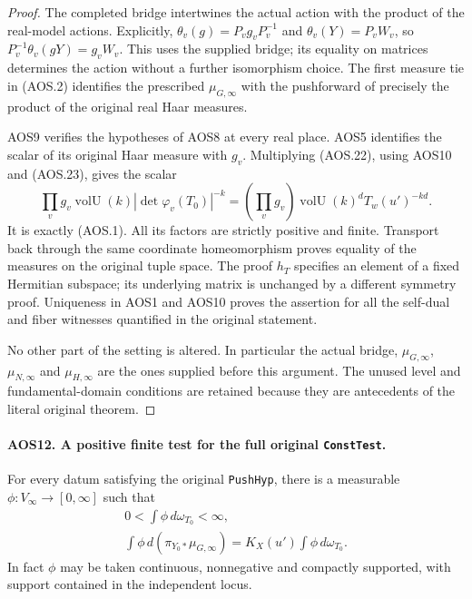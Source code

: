 \documentclass[11pt,a4paper]{article}
\numberwithin{equation}{section}
\theoremstyle{remark}\newtheorem{remark}[theorem]{Remark}
\begin{document}
\begin{proof}
The completed bridge intertwines the actual action with the product
of the real-model actions.  Explicitly,
$\theta_v(g)=P_vg_vP_v^{-1}$ and
$\theta_v(Y)=P_vW_v$, so
$P_v^{-1}\theta_v(gY)=g_vW_v$.  This uses the supplied bridge;
its equality on matrices determines the action without a further
isomorphism choice.  The first measure tie in (AOS.2) identifies
the prescribed $\mu_{G,\infty}$ with the pushforward of precisely
the product of the original real Haar measures.

AOS9 verifies the hypotheses of AOS8 at every real place.  AOS5
identifies the scalar of its original Haar measure with $g_v$.
Multiplying (AOS.22), using AOS10 and (AOS.23), gives the scalar
\[
       \prod_v g_v\operatorname{volU}(k)
                            |\det\varphi_v(T_0)|^{-k}
          =\left(\prod_vg_v\right)
               \operatorname{volU}(k)^dT_w(u')^{-kd}.
 \tag{AOS.27}
\]
It is exactly (AOS.1).  All its factors are strictly positive and
finite.  Transport back through the same coordinate homeomorphism
proves equality of the measures on the original tuple space.
The proof $h_T$ specifies an element of a fixed Hermitian subspace;
its underlying matrix is unchanged by a different symmetry proof.
Uniqueness in AOS1 and AOS10 proves the assertion for all the
self-dual and fiber witnesses quantified in the original statement.

No other part of the setting is altered.  In particular the actual
bridge, $\mu_{G,\infty}$, $\mu_{N,\infty}$ and
$\mu_{H,\infty}$ are the ones supplied before this argument.
The unused level and fundamental-domain conditions are retained
because they are antecedents of the literal original theorem.
\end{proof}

\paragraph{AOS12. A positive finite test for the full original \texttt{Const\allowbreak Test}.}
\label{claim:AOS12}
For every datum satisfying the original \texttt{Push\allowbreak Hyp}, there is a
measurable $\phi:V_\infty\to[0,\infty]$ such that
\[
 \begin{gathered}
             0<\int\phi\,d\omega_{T_0}<\infty,\\
 \int\phi\,d(\pi_{Y_0*}\mu_{G,\infty})
                  =K_X(u')\int\phi\,d\omega_{T_0}.
 \end{gathered}
 \tag{AOS.28}
\]
In fact $\phi$ may be taken continuous, nonnegative and compactly
supported, with support contained in the independent locus.
\end{document}
